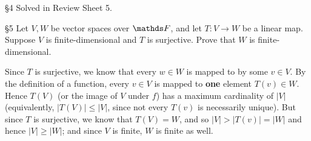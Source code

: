 \documentclass{homework}
\begin{document}
\begin{problem}{\S 4}
  Solved in Review Sheet 5.
\end{problem}

\begin{problem}{\S 5}
  Let $V,W$ be vector spaces over $\F$, and let $T:V\to W$ be a linear map. Suppose $V$ is
  finite-dimensional and $T$ is surjective. Prove that $W$ is finite-dimensional.
\end{problem}

\begin{solution}
  Since $T$ is surjective, we know that every $w\in W$ is mapped to by some $v\in V$. By the
  definition of a function, every $v\in V$ is mapped to \textbf{one} element $T(v)\in W$. Hence
  $T(V)$ (or the image of $V$ under $f$) has a maximum cardinality of $\left| V \right|
  $ (equivalently, $\left| T(V) \right| \le \left| V \right| $, since not every $T(v)$ is
  necessarily unique).  But since $T$ is surjective, we know that $T(V)=W$, and so $\left| V \right|
  > \left| T(v) \right| = \left| W \right|$ and hence $\left| V \right| \ge \left| W \right| $; and
  since $V$ is finite, $W$ is finite as well.
\end{solution}
\end{document}
